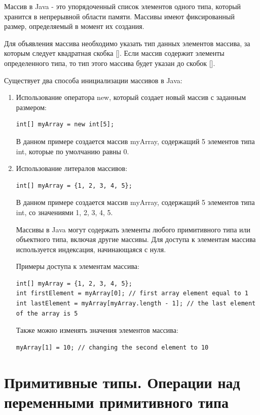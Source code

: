 Массив в Java - это упорядоченный список элементов одного типа, который хранится в непрерывной области памяти. Массивы имеют фиксированный размер, определяемый в момент их создания.

Для объявления массива необходимо указать тип данных элементов массива, за которым следует квадратная скобка []. Если массив содержит элементы определенного типа, то тип этого массива будет указан до скобок [].

Существует два способа инициализации массивов в Java:

\begin{enumerate}
    \item Использование оператора new, который создает новый массив с заданным размером:

\begin{lstlisting}
int[] myArray = new int[5];
\end{lstlisting}

В данном примере создается массив myArray, содержащий 5 элементов типа int, которые по умолчанию равны 0.
    \item Использование литералов массивов:

\begin{lstlisting}
int[] myArray = {1, 2, 3, 4, 5};
\end{lstlisting}

В данном примере создается массив myArray, содержащий 5 элементов типа int, со значениями 1, 2, 3, 4, 5.

Массивы в Java могут содержать элементы любого примитивного типа или объектного типа, включая другие массивы. Для доступа к элементам массива используется индексация, начинающаяся с нуля.

Примеры доступа к элементам массива:

\begin{lstlisting}
int[] myArray = {1, 2, 3, 4, 5};
int firstElement = myArray[0]; // first array element equal to 1
int lastElement = myArray[myArray.length - 1]; // the last element of the array is 5
\end{lstlisting}

Также можно изменять значения элементов массива:

\begin{lstlisting}
myArray[1] = 10; // changing the second element to 10
\end{lstlisting}
\end{enumerate}

\newpage
\chapter{Примитивные типы. Операции над переменными примитивного типа}
